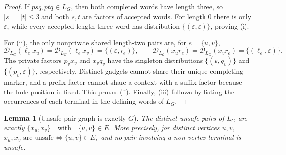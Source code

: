 \documentclass[10pt,a4paper]{article}
\newtheorem{lemma}[theorem]{Lemma}
\theoremstyle{definition}
\theoremstyle{remark}
\newcommand{\D}{\mathcal D}
\begin{document}
\begin{proof}
If $psq,ptq\in L_G$, then both completed words have length three, so
$|s|=|t|\le3$ and both $s,t$ are factors of accepted words.
For length $0$ there is only $\varepsilon$, while every accepted length-three
word has distribution $\{(\varepsilon,\varepsilon)\}$, proving \textup{(i)}.

For \textup{(ii)}, the only nonprivate shared length-two pairs are, for
$e=\{u,v\}$,
\[
\D_{L_G}(\ell_ex_u)=\D_{L_G}(\ell_ex_v)=\{(\varepsilon,r_e)\},
\qquad
\D_{L_G}(x_ur_e)=\D_{L_G}(x_vr_e)=\{(\ell_e,\varepsilon)\}.
\]
The private factors $p_vx_v$ and $x_vq_v$ have the singleton distributions
$\{(\varepsilon,q_v)\}$ and $\{(p_v,\varepsilon)\}$, respectively.
Distinct gadgets cannot share their unique completing marker, and a prefix
factor cannot share a context with a suffix factor because the hole position
is fixed.  This proves \textup{(ii)}.  Finally, \textup{(iii)} follows by
listing the occurrences of each terminal in the defining words of $L_G$.
\end{proof}

\begin{lemma}[Unsafe-pair graph is exactly \(G\)]
\label{graph:lem:unsafe-exact}
The distinct unsafe pairs of \(L_G\) are exactly
\(\{x_u,x_v\} \quad\text{with}\quad \{u,v\}\in E.\)
More precisely, for distinct vertices \(u,v\), \(x_u,x_v\text{ are unsafe} \iff \{u,v\}\in E,\) and no pair involving a non-vertex terminal is unsafe.
\end{lemma}
\end{document}
